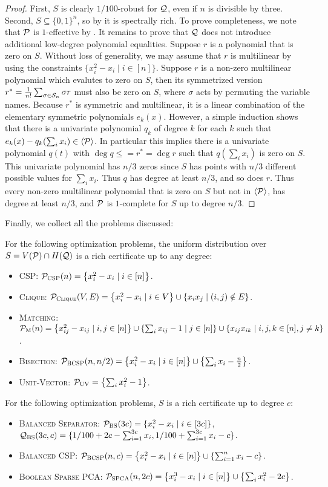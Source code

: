 \begin{proof}
First, $S$ is clearly $1/100$-robust for $\mathcal Q$, even if $n$ is divisible by three. Second, $S \subseteq \{0,1\}^n$, so by  it is spectrally rich. To prove completeness, we note that $\mathcal P$ is $1$-effective by . It remains to prove that $\mathcal Q$ does not introduce additional low-degree polynomial equalities. 
Suppose $r$ is a polynomial that is zero on $S$.  
Without loss of generality, we may assume that $r$ is multilinear by using the constraints $\{x_i^2 - x_i \mid i \in [n]\}$.
Suppose $r$ is a non-zero multilinear polynomial which evalutes to zero on $S$, then its symmetrized version $r^* = \frac{1}{n!}\sum_{\sigma \in \mathcal S_n} \sigma r$ must also be zero on $S$, where $\sigma$ acts by permuting the variable names. Because $r^*$ is symmetric and multilinear, it is a linear combination of the elementary symmetric polynomials $e_k(x)$. However, a simple induction shows that there is a univariate polynomial $q_k$ of degree $k$ for each $k$ such that $e_k(x) - q_k(\sum_i x_i) \in \langle \mathcal P \rangle$. In particular this implies there is a univariate polynomial $q(t)$ with $\deg q \leq = r^* = \deg r$ such that $q(\sum_i x_i)$ is zero on $S$.
This univariate polynomial has $n/3$ zeros since $S$ has points with $n/3$ different possible values for $\sum_i x_i$. Thus $q$ has degree at least $n/3$, and so does $r$. Thus every non-zero multilinear polynomial that is zero on $S$ but not in $\langle \mathcal P\rangle$, has degree at least $n/3$, and $\mathcal P$ is $1$-complete for $S$ up to degree $n/3$.
\end{proof}
Finally, we collect all the problems discussed:
\begin{corollary}\label{cor:examples}
For the following optimization problems, the uniform distribution over $S = V(\mathcal P) \cap H(\mathcal Q)$ is a rich certificate up to any degree:
\begin{itemize}
\item \textsc{CSP}: $\mathcal P_{\textsc{CSP}}(n) = \left\{x_i^2 - x_i \mid i \in [n]\right\}$. 
\item \textsc{Clique}: $\mathcal P_{\textsc{Clique}}(V,E) = \left\{x_i^2 - x_i \mid i \in V\right\} \cup \left\{x_ix_j \mid (i,j) \notin E\right\}$.
\item \textsc{Matching}: $\mathcal P_{\textsc{M}}(n) = \left\{x_{ij}^2 - x_{ij} \mid i,j \in [n]\right\} \cup \left\{\sum_i x_{ij} - 1 \mid j \in [n]\right\} \cup \left\{x_{ij}x_{ik} \mid i,j,k \in [n], j\neq k\right\}$.
\item \textsc{Bisection}: $\mathcal P_{\textsc{BCSP}}(n,n/2) = \left\{x_i^2 - x_i \mid i \in [n]\right\} \cup \left\{\sum_i x_i - \frac{n}{2}\right\}$.
\item \textsc{Unit-Vector}: $\mathcal P_{\textsc{UV}} = \left\{\sum_i x_i^2 - 1\right\}$.
\end{itemize}
For the following optimization problems, $S$ is a rich certificate up to degree $c$:
\begin{itemize}
\item \textsc{Balanced Separator}: $\mathcal P_{\textsc{BS}}(3c) = \{x_i^2 - x_i \mid i \in [3c]\}$, $\mathcal Q_{\textsc{BS}}(3c,c) = \{1/100 + 2c - \sum_{i=1}^{3c} x_i, 1/100 + \sum_{i=1}^{3c} x_i - c\}$.
\item \textsc{Balanced CSP}: $\mathcal P_{\textsc{BCSP}}(n,c) = \left\{x_i^2 - x_i \mid i \in [n]\right\} \cup \left\{\sum_{i=1}^n x_i - c\right\}$.
\item \textsc{Boolean Sparse PCA}: $\mathcal P_{\textsc{SPCA}}(n,2c) = \left\{x_i^3 - x_i \mid i \in [n]\right\} \cup \left\{\sum_i x_i^2 - 2c\right\}$.
\end{itemize}
\end{corollary}
